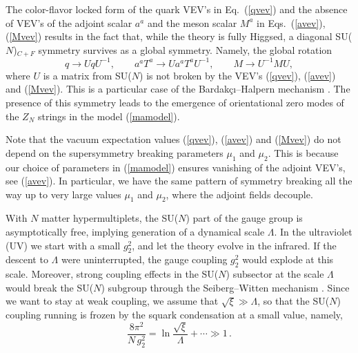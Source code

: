 \documentclass[epsfig,12pt]{article}
\def\beq{\begin{equation}}
\def\eeq{\end{equation}}
\begin{document}
\vspace{2mm}


The color-flavor locked form of the quark VEV's in
Eq.~(\ref{qvev}) and the absence of VEV's of the adjoint scalar $a^a$ 
and the meson scalar $M^a$ in
Eqs.~(\ref{avev}), (\ref{Mvev})
results in the fact that, while the theory is fully Higgsed, a diagonal
SU($N$)$_{C+F}$ symmetry survives as a global symmetry. Namely, the global rotation
\beq
q\to UqU^{-1},\qquad a^aT^a\to Ua^aT^aU^{-1},\qquad M\to U^{-1}MU,
\label{c+f}
\eeq
where $U$ is a matrix from SU($N$)
is not broken by the VEV's (\ref{qvev}), (\ref{avev}) and (\ref{Mvev}).
This is a particular case  of the Bardak\c{c}\i--Halpern mechanism \cite{BarH}.
The presence of this symmetry leads to the emergence of
orientational zero modes \cite{ABEKY} of the $Z_N$ strings in the model (\ref{mamodel}).

Note that the vacuum expectation values (\ref{qvev}),  (\ref{avev}) and  (\ref{Mvev})
 do not depend on
the supersymmetry breaking parameters $\mu_1$ and $\mu_2$. This
is because our choice of parameters in (\ref{mamodel}) ensures
vanishing of the adjoint VEV's, see (\ref{avev}). In particular, we have
the same pattern of symmetry breaking all the way up to very large
values $\mu_1$ and $\mu_2$, where the adjoint fields decouple.

With $N$ matter hypermultiplets, the  SU($N$) part of the gauge group
is asymptotically free,  implying generation of a dynamical scale
 $\Lambda$. In the ultraviolet (UV) we start with a small $g_2^2$,
 and let the theory evolve in the infrared. 
If the descent to  $\Lambda$ were uninterrupted, the gauge coupling
$g_2^2$ would explode at this scale.
Moreover,  strong coupling effects in the SU($N$) subsector at the
scale $\Lambda$ would break the  SU($N$) subgroup through the
Seiberg--Witten mechanism \cite{SW}.  Since we want to stay
at weak coupling,   we assume
that $\sqrt{\xi}\gg \Lambda$,
so that the SU($N$) coupling running is frozen by the squark condensation
at a small value, namely,
\beq
\frac{8\pi^2}{N\, g_2^2}=\ln{\frac{\sqrt{\xi}}{\Lambda}} +\cdots \gg 1\,.
\label{g2}
\eeq

\vspace{2mm}
\end{document}
